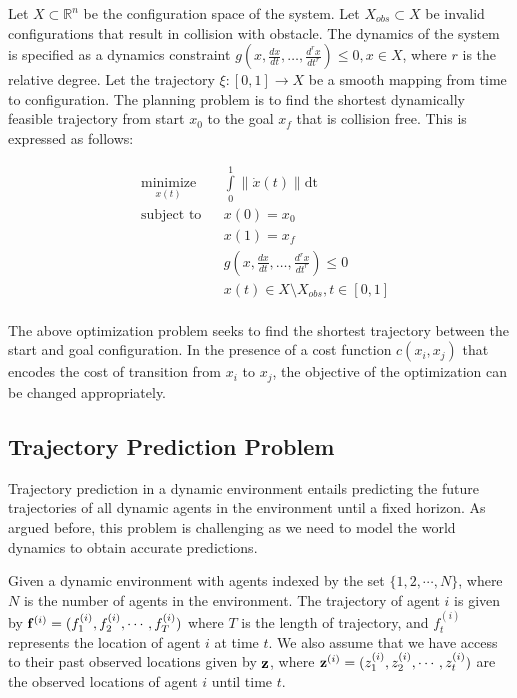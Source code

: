 Let $X \subset \mathbb{R}^n$ be the configuration space of the system. Let $X_{obs} \subset X$ be invalid configurations that result in collision with obstacle. The dynamics of the system is specified as a dynamics constraint $g(x, \frac{dx}{dt}, \dots, \frac{d^rx}{dt^r}) \leq 0, x \in X$, where $r$ is the relative degree. Let the trajectory $\xi: [0, 1] \rightarrow X$ be a smooth mapping from time to configuration. The planning problem is to find the shortest dynamically feasible trajectory from start $x_0$ to the goal $x_f$ that is collision free. This is expressed as follows:

\begin{equation}
\begin{aligned}
\label{eq:planning-problem}
& \underset{x(t)}{\text{minimize}} & & \int\limits_0^1 \| \dot{x}(t) \| \mathrm{dt} \\
& \text{subject to} & & x(0) = x_0 \\
&                   & & x(1) = x_f \\
&                   & & g(x, \frac{dx}{dt}, \dots, \frac{d^rx}{dt^r}) \leq 0 \\
&				    & & x(t) \in X \setminus X_{obs}, t \in [0,1] \\
\end{aligned}
\end{equation}

The above optimization problem seeks to find the shortest trajectory between the start and goal configuration. In the presence of a cost function $c(x_i, x_j)$ that encodes the cost of transition from $x_i$ to $x_j$, the objective of the optimization can be changed appropriately.

\subsection{Trajectory Prediction Problem}
\label{sec:intro-traj-pred-probl}

Trajectory prediction in a dynamic environment entails predicting the future trajectories of all dynamic agents in the environment until a fixed horizon. As argued before, this problem is challenging as we need to model the world dynamics to obtain accurate predictions.

Given a dynamic environment with agents indexed by the set $\{1, 2, \cdots, N\}$, where $N$ is the number of agents in the environment. The trajectory of agent $i$ is given by $\mathbf{f}^{(i)} = (f_1^{(i)}, f_2^{(i)}, \cdots, f_T^{(i)})$ where $T$ is the length of trajectory, and $f_t^{(i)}$ represents the location of agent $i$ at time $t$. We also assume that we have access to their past observed locations given by $\mathbf{z}$, where $\mathbf{z}^{(i)} = (z_1^{(i)}, z_2^{(i)}, \cdots, z_t^{(i)})$ are the observed locations of agent $i$ until time $t$. \\



